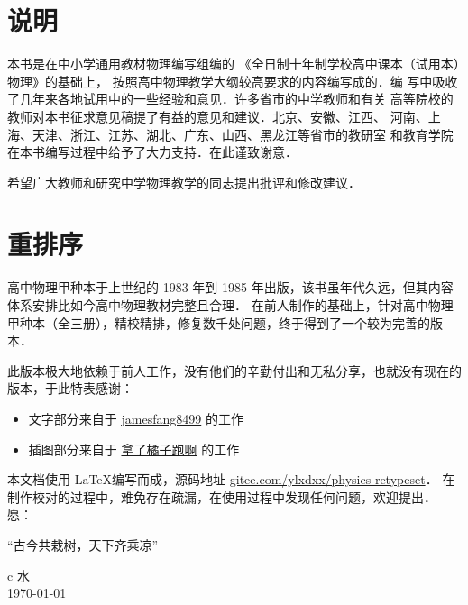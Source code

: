 \chapter{说明}

本书是在中小学通用教材物理编写组编的
《全日制十年制学校高中课本（试用本）物理》的基础上，
按照高中物理教学大纲较高要求的内容编写成的．编
写中吸收了几年来各地试用中的一些经验和意见．许多省市的中学教师和有关
高等院校的教师对本书征求意见稿提了有益的意见和建议．北京、安徽、江西、
河南、上海、天津、浙江、江苏、湖北、广东、山西、黑龙江等省市的教研室
和教育学院在本书编写过程中给予了大力支持．在此谨致谢意．

希望广大教师和研究中学物理教学的同志提出批评和修改建议．


\chapter{重排序}

高中物理甲种本于上世纪的 1983 年到 1985 年出版，该书虽年代久远，但其内容体系安排比如今高中物理教材完整且合理．
在前人制作的基础上，针对高中物理甲种本（全三册），精校精排，修复数千处问题，终于得到了一个较为完善的版本．

此版本极大地依赖于前人工作，没有他们的辛勤付出和无私分享，也就没有现在的版本，于此特表感谢：
\begin{itemize}
	\item
	文字部分来自于 \href{https://github.com/jamesfang8499}{jamesfang8499}
	的工作
	\item
	插图部分来自于
	\href{https://www.latexstudio.net/index/lists/barsearch/author/1077.html}{拿了橘子跑啊}
	的工作
\end{itemize}
本文档使用 \LaTeX 编写而成，源码地址 \href{https://gitee.com/ylxdxx/physics-retypeset}{gitee.com/ylxdxx/physics-retypeset}．
在制作校对的过程中，难免存在疏漏，在使用过程中发现任何问题，欢迎提出．
愿：
\begin{center}
	\kaishu 
	\vspace*{0.5cm}
	“古今共栽树，天下齐乘凉”
	\vspace*{0.3cm}
\end{center}
\begin{center}
	\flushright
	\begin{tblr}{c}
		水   \\
		\today
	\end{tblr}
\end{center}

